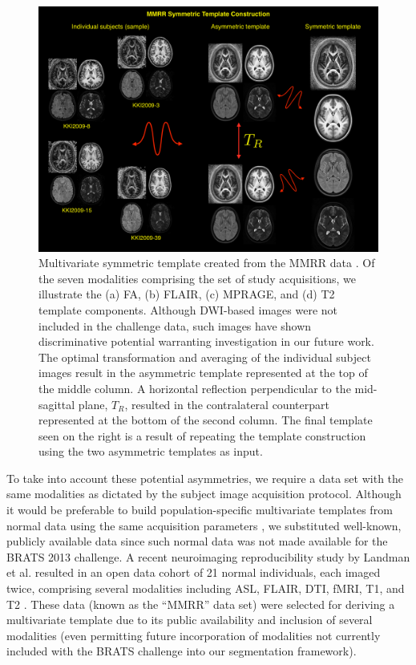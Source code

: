 \documentclass[preprint,authoryear,review,12pt]{elsarticle}
\begin{document}
\begin{figure}
    \centerline{\includegraphics[width=130mm]{templateKirby.pdf}}
  \caption{Multivariate symmetric template created from the MMRR 
           data \citep{landman2011}.  Of the seven modalities 
           comprising the set of study acquisitions, we illustrate the
           (a) FA, (b) FLAIR, (c) MPRAGE, and (d) T2 template components.
           Although DWI-based images were not included in the challenge data, 
           such images have shown discriminative potential \citep{price2003,cha2005} 
           warranting investigation in our future work.  
           The optimal transformation and averaging of the individual 
           subject images result in the asymmetric template represented at 
           the top of the middle column.  A horizontal reflection 
           perpendicular to the mid-sagittal
           plane, $T_R$, resulted in the contralateral counterpart represented
           at the bottom of the second column.  The final template seen on
           the right is a result of repeating the template construction using
           the two asymmetric templates as input.
          }
  \label{fig:symmetrictemplates}
\end{figure}


To take into account these potential asymmetries, we 
require a data set with the same modalities as dictated
by the subject image acquisition protocol.  Although it
would be preferable to build population-specific multivariate
templates from normal data using the same acquisition 
parameters \citep{avants2010}, we substituted well-known,
publicly available data since such normal data was not made available
for the BRATS 2013 challenge. 
A recent neuroimaging reproducibility study
by Landman et al. resulted in an open data cohort of 21
normal individuals, each imaged twice, comprising several
modalities including ASL, FLAIR, DTI, fMRI, T1, and T2 
\citep{landman2011}.  These data (known as the
``MMRR'' data set) were selected for deriving
a multivariate template due to its public availability and
inclusion of several modalities (even permitting future 
incorporation of modalities 
not currently included with the BRATS challenge into our 
segmentation framework).  
\end{document}
